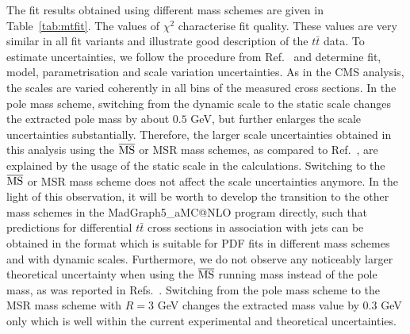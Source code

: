 \documentclass[12pt,a4paper]{article}
\newcommand{\msbar}{\ensuremath{\overline{\rm MS}}\xspace}
\begin{document}
The fit results obtained using different mass schemes are given in Table~\ref{tab:mtfit}. The values of $\chi^2$ characterise fit quality. These values are very similar in all fit variants and illustrate good description of the $t\bar{t}$ data. To estimate uncertainties, we follow the procedure from Ref.~\cite{Sirunyan:2019zvx} and determine fit, model, parametrisation and scale variation uncertainties. As in the CMS analysis, the scales are varied coherently in all bins of the measured cross sections.
In the pole mass scheme, switching from the dynamic scale to the static scale changes the extracted pole mass by about $0.5$ GeV, but further enlarges the scale uncertainties substantially. Therefore, the larger scale uncertainties obtained in this analysis using the \msbar or MSR mass schemes, as compared to Ref.~\cite{Sirunyan:2019zvx}, are explained by the usage of the static scale in the calculations. Switching to the \msbar or MSR mass scheme does not affect the scale uncertainties anymore. In the light of this observation, it will be worth to develop the transition to the other mass schemes in the MadGraph5\_aMC@NLO program directly, such that predictions for differential $t\bar{t}$ cross sections in association with jets can be obtained in the format which is suitable for PDF fits in different mass schemes and with dynamic scales. Furthermore, we do not observe any noticeably larger theoretical uncertainty when using the \msbar running mass instead of the pole mass, as was reported in Refs.~\cite{Fuster:2017rev,Aad:2019mkw}. Switching from the pole mass scheme to the MSR mass scheme with $R=3$ GeV changes the extracted mass value by $0.3$ GeV only which is well within the current experimental and theoretical uncertainties.
\end{document}
